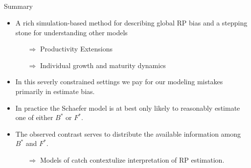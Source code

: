 \documentclass[ xcolor = pdftex, dvipsnames, table ]{beamer}
\begin{document}
\subsection{}
%
\begin{frame}{Summary}
\linespread{1.25}
%
$~$\\
\vspace*{-1.5cm}
\hspace*{-1cm}
\begin{itemize}	
	\item A rich simulation-based method for describing global RP bias and a stepping stone for understanding other models	
	\begin{itemize}
                \item[$\Rightarrow$] Productivity Extensions
                \item[$\Rightarrow$] Individual growth and maturity dynamics
        \end{itemize}
	\item In this severly constrained settings we pay for our modeling mistakes primarily in estimate bias.
	\item In practice the Schaefer model is at best only likely to reasonably estimate one of either $B^*$ or $F^*$.
	\item The observed contrast serves to distribute the available information among $B^*$ and $F^*$. 
	\begin{itemize}
		\item[$\Rightarrow$] Models of catch contextulize interpretation of RP estimation.
	\end{itemize}
\end{itemize}
\end{frame}
\end{document}
